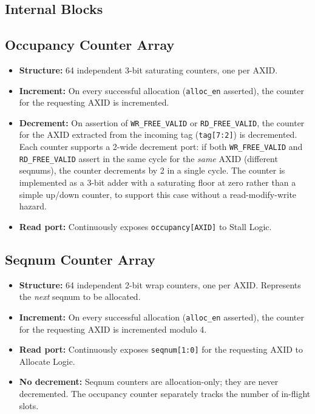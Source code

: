 \subsection{Internal Blocks}

\subsection{Occupancy Counter Array}

\begin{itemize}
  \item \textbf{Structure:} 64 independent 3-bit saturating counters,
        one per AXID.
  \item \textbf{Increment:} On every successful allocation
        (\texttt{alloc\_en} asserted), the counter for the requesting
        AXID is incremented.
  \item \textbf{Decrement:} On assertion of \texttt{WR\_FREE\_VALID} or
        \texttt{RD\_FREE\_VALID}, the counter for the AXID extracted from
        the incoming tag (\texttt{tag[7:2]}) is decremented. Each counter
        supports a 2-wide decrement port: if both \texttt{WR\_FREE\_VALID}
        and \texttt{RD\_FREE\_VALID} assert in the same cycle for the
        \emph{same} AXID (different seqnums), the counter decrements by 2
        in a single cycle. The counter is implemented as a 3-bit adder
        with a saturating floor at zero rather than a simple up/down
        counter, to support this case without a read-modify-write hazard.
  \item \textbf{Read port:} Continuously exposes
        \texttt{occupancy[AXID]} to Stall Logic.
\end{itemize}

\subsection{Seqnum Counter Array}

\begin{itemize}
  \item \textbf{Structure:} 64 independent 2-bit wrap counters, one per
        AXID. Represents the \emph{next} seqnum to be allocated.
  \item \textbf{Increment:} On every successful allocation
        (\texttt{alloc\_en} asserted), the counter for the requesting
        AXID is incremented modulo 4.
  \item \textbf{Read port:} Continuously exposes \texttt{seqnum[1:0]}
        for the requesting AXID to Allocate Logic.
  \item \textbf{No decrement:} Seqnum counters are allocation-only;
        they are never decremented. The occupancy counter separately
        tracks the number of in-flight slots.
\end{itemize}


